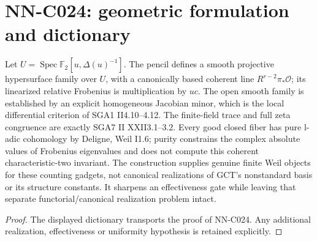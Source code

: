 \section{NN-C024: geometric formulation and dictionary}
\begin{geometricstatement}[NN-C024]
Let $U=\operatorname{Spec}\mathbb F_2[u,\Delta(u)^{-1}]$. The pencil defines a smooth projective hypersurface family over $U$, with a canonically based coherent line $R^{r-2}\pi_*\mathcal O$; its linearized relative Frobenius is multiplication by $uc$. The open smooth family is established by an explicit homogeneous Jacobian minor, which is the local differential criterion of SGA1 II4.10--4.12. The finite-field trace and full zeta congruence are exactly SGA7 II XXII3.1--3.2. Every good closed fiber has pure l-adic cohomology by Deligne, Weil I1.6; purity constrains the complex absolute values of Frobenius eigenvalues and does not compute this coherent characteristic-two invariant. The construction supplies genuine finite Weil objects for these counting gadgets, not canonical realizations of GCT's nonstandard basis or its structure constants. It sharpens an effectiveness gate while leaving that separate functorial/canonical realization problem intact.
\end{geometricstatement}
\begin{proof} The displayed dictionary transports the proof of NN-C024. Any additional realization, effectiveness or uniformity hypothesis is retained explicitly.\end{proof}


